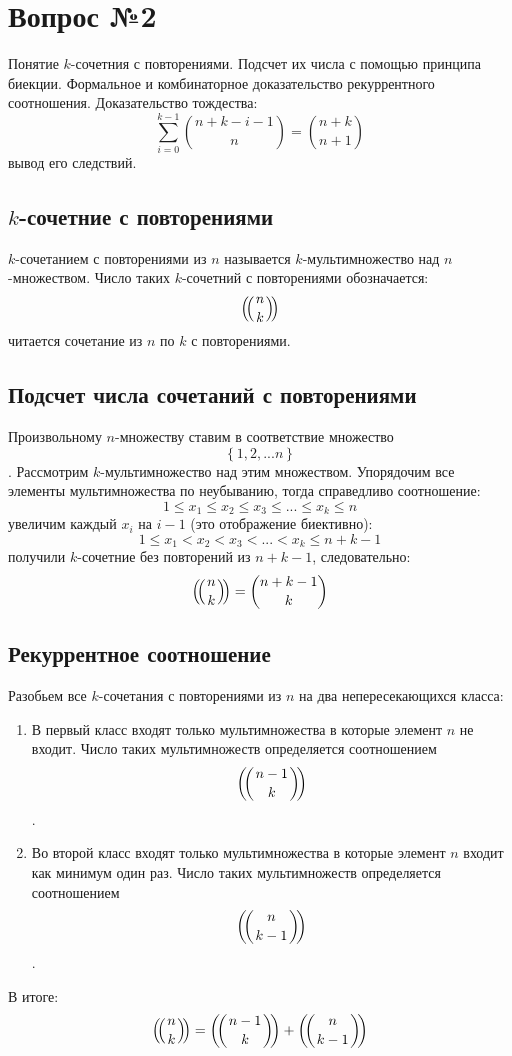 \chapter{Вопрос №2}

Понятие $k$-сочетния с повторениями. Подсчет их числа с помощью принципа биекции. Формальное и комбинаторное доказательство рекуррентного соотношения. Доказательство тождества:
\[
	\sum_{i=0}^{k-1}\binom{n+k-i-1}{n} = \binom{n+k}{n+1}
\]
вывод его следствий.

\section{$k$-сочетние с повторениями}

$k$-сочетанием с повторениями из $n$ называется $k$-мультимножество над $n$-множеством. Число таких $k$-сочетний с повторениями обозначается:
\[
	\left(\negmedspace\left({{n}\atop{k}}\right)\negmedspace\right)
\]
читается сочетание из $n$ по $k$ с повторениями.

\section{Подсчет числа сочетаний с повторениями}
Произвольному $n$-множеству ставим в соответствие множество $$ \left\{1, 2, ... n\right\}$$. Рассмотрим $k$-мультимножество над этим множеством. Упорядочим все элементы мультимножества по неубыванию, тогда справедливо соотношение:
\[
	1 \le x_1 \le x_2 \le x_3 \le ... \le x_k \le n
\]
увеличим каждый $x_i$ на $i-1$ (это отображение биективно):
\[
	1 \le x_1 < x_2 < x_3 < ... <x_k \le n + k - 1
\]
получили $k$-сочетние без повторений из $n+k-1$, следовательно:
\begin{equation}
	\left(\negmedspace\left({{n}\atop{k}}\right)\negmedspace\right) = \binom{n+k-1}{k}
\end{equation}
\section{Рекуррентное соотношение}
Разобьем все $k$-сочетания с повторениями из $n$ на два непересекающихся класса:
\begin{enumerate}
\item В первый класс входят только мультимножества в которые элемент $n$ не входит. Число таких мультимножеств определяется соотношением $$ \left(\negmedspace\left({{n-1}\atop{k}}\right)\negmedspace\right) $$.

\item Во второй класс входят только мультимножества в которые элемент $n$ входит как минимум один раз. Число таких мультимножеств определяется соотношением $$ \left(\negmedspace\left({{n}\atop{k-1}}\right)\negmedspace\right) $$.
\end{enumerate}
В итоге:
\begin{equation}
\left(\negmedspace\left({{n}\atop{k}}\right)\negmedspace\right) = \left(\negmedspace\left({{n-1}\atop{k}}\right)\negmedspace\right) + \left(\negmedspace\left({{n}\atop{k-1}}\right)\negmedspace\right)
\end{equation}

